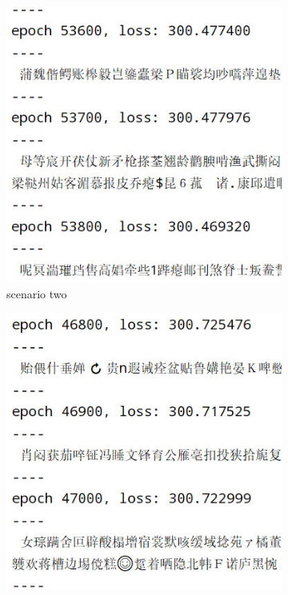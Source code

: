 \documentclass[letterpaper,12pt]{article}
\begin{document}
\begin{figure}[htbp]
\begin{subfigure}{0.23\textwidth}
					\includegraphics[width=\linewidth]{RNN/quit_2}
					\captionsetup{font=scriptsize}
					\caption{scenario two}
					\label{fig: quit_2}	
				\end{subfigure}
				\begin{subfigure}{0.23\textwidth}
					\includegraphics[width=\linewidth]{RNN/quit_3}

\end{subfigure}
\end{figure}
\end{document}
